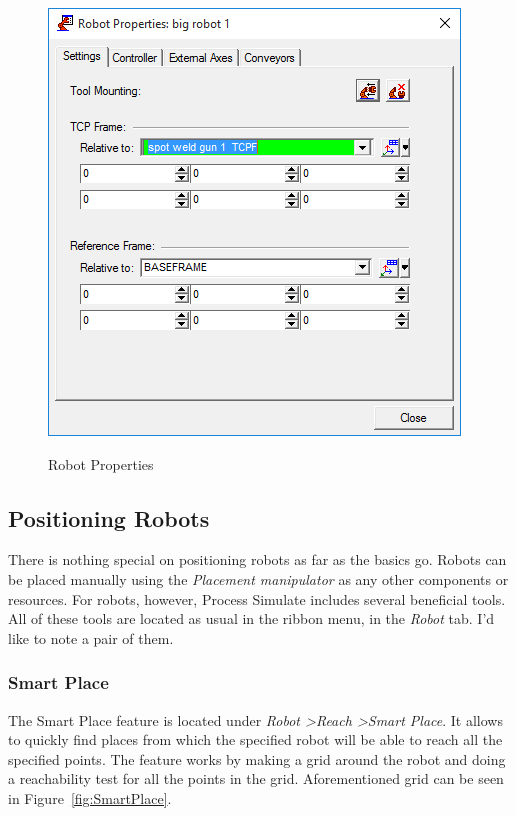 \begin{figure}[H]
    \caption{Robot Properties}
    \centering
    \includegraphics{robot_properties_toolframe}
    \label{fig:RobotProperties}
\end{figure}

\subsection{Positioning Robots}
There is nothing special on positioning robots as far as the basics go. 
Robots can be placed manually using the \emph{Placement manipulator} as any other components or resources.
For robots, however, Process Simulate includes several beneficial tools.
All of these tools are located as usual in the ribbon menu, in the \emph{Robot} tab.
I'd like to note a pair of them. \\

\subsubsection{Smart Place}
The Smart Place feature is located under \emph{Robot \textgreater Reach \textgreater Smart Place}.
It allows to quickly find places from which the specified robot will be able to reach all the specified points.
The feature works by making a grid around the robot and doing a reachability test for all the points in the grid.  
Aforementioned grid can be seen in Figure~\ref{fig:SmartPlace}.

